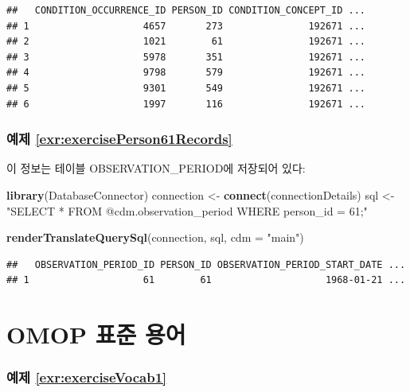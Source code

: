 \documentclass[11pt]{book}
\newenvironment{Shaded}{\begin{snugshade}}{\end{snugshade}}
\newcommand{\KeywordTok}[1]{\textcolor[rgb]{0.13,0.29,0.53}{\textbf{#1}}}
\newcommand{\DataTypeTok}[1]{\textcolor[rgb]{0.13,0.29,0.53}{#1}}
\newcommand{\StringTok}[1]{\textcolor[rgb]{0.31,0.60,0.02}{#1}}
\newcommand{\NormalTok}[1]{#1}
\theoremstyle{definition}
\theoremstyle{definition}
\theoremstyle{definition}
\theoremstyle{remark}
\begin{document}
\begin{verbatim}
##   CONDITION_OCCURRENCE_ID PERSON_ID CONDITION_CONCEPT_ID ...
## 1                    4657       273               192671 ...
## 2                    1021        61               192671 ...
## 3                    5978       351               192671 ...
## 4                    9798       579               192671 ...
## 5                    9301       549               192671 ...
## 6                    1997       116               192671 ...
\end{verbatim}

\subsubsection*{예제
\ref{exr:exercisePerson61Records}}\label{-refexrexerciseperson61records}

이 정보는 테이블 OBSERVATION\_PERIOD에 저장되어 있다:

\begin{Shaded}
\begin{Highlighting}[]
\KeywordTok{library}\NormalTok{(DatabaseConnector)}
\NormalTok{connection <-}\StringTok{ }\KeywordTok{connect}\NormalTok{(connectionDetails)}
\NormalTok{sql <-}\StringTok{ "SELECT *}
\StringTok{FROM @cdm.observation_period}
\StringTok{WHERE person_id = 61;"}

\KeywordTok{renderTranslateQuerySql}\NormalTok{(connection, sql, }\DataTypeTok{cdm =} \StringTok{"main"}\NormalTok{)}
\end{Highlighting}
\end{Shaded}

\begin{verbatim}
##   OBSERVATION_PERIOD_ID PERSON_ID OBSERVATION_PERIOD_START_DATE ...
## 1                    61        61                    1968-01-21 ...
\end{verbatim}

\section{OMOP 표준 용어}\label{Vocabanswers}

\subsubsection*{예제
\ref{exr:exerciseVocab1}}\label{-refexrexercisevocab1}
\end{document}
